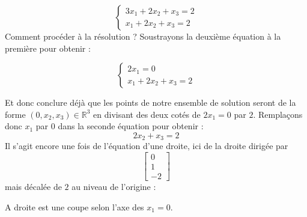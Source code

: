 \documentclass{article}
\begin{document}
$$ \begin{cases}3x_1 + 2x_2 + x_3 = 2\\x_1 + 2x_2 + x_3 = 2 \end{cases}$$
Comment procéder à la résolution ? Soustrayons la deuxième équation à la première pour obtenir :

$$ \begin{cases}2x_1  = 0\\ x_1 + 2x_2 + x_3 = 2 \end{cases}$$

\noindent Et donc conclure déjà que les points de notre ensemble de solution seront de la forme $(0, x_2, x_3)\in \mathbb{R}^3$ en divisant des deux cotés de $ 2x_1  = 0$ par $2$. Remplaçons donc $x_1$ par $0$ dans la seconde équation pour obtenir :
$$ 2x_2 + x_3 = 2 $$
\noindent Il s'agit encore une fois de l'équation d'une droite, ici de la droite dirigée par $$\begin{bmatrix}0 \\ 1 \\ -2 \end{bmatrix}$$ mais décalée de $2$ au niveau de l'origine :
\\
\hspace{1CM}
A droite est une coupe selon l'axe des $x_1 = 0$. 
\end{document}
